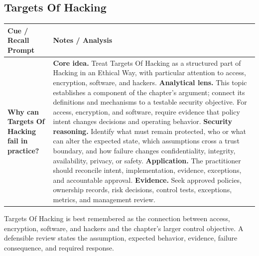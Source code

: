 \documentclass[11pt]{article}
\newcommand{\CornellHeader}{%
\rowcolor{Navy}\color{white}\bfseries Cue / Recall Prompt & \color{white}\bfseries Notes / Analysis\\\hline}
\newcommand{\CornellRow}[2]{%
\cellcolor{CueGray}\RaggedRight\textbf{#1} & \RaggedRight #2\\\hline}
\begin{document}
\subsection*{Targets Of Hacking}
\begin{longtable}{>{\RaggedRight\arraybackslash}p{}|>{\RaggedRight\arraybackslash}p{}}
\CornellHeader
\CornellRow{Why can Targets Of Hacking fail in practice?}{\textbf{Core idea.} Treat Targets Of Hacking as a structured part of Hacking in an Ethical Way, with particular attention to access, encryption, software, and hackers. \textbf{Analytical lens.} This topic establishes a component of the chapter's argument; connect its definitions and mechanisms to a testable security objective. For access, encryption, and software, require evidence that policy intent changes decisions and operating behavior. \textbf{Security reasoning.} Identify what must remain protected, who or what can alter the expected state, which assumptions cross a trust boundary, and how failure changes confidentiality, integrity, availability, privacy, or safety. \textbf{Application.} The practitioner should reconcile intent, implementation, evidence, exceptions, and accountable approval. \textbf{Evidence.} Seek approved policies, ownership records, risk decisions, control tests, exceptions, metrics, and management review.}
\end{longtable}
\begin{topicsummary}
Targets Of Hacking is best remembered as the connection between access, encryption, software, and hackers and the chapter's larger control objective. A defensible review states the assumption, expected behavior, evidence, failure consequence, and required response.
\end{topicsummary}
\end{document}
